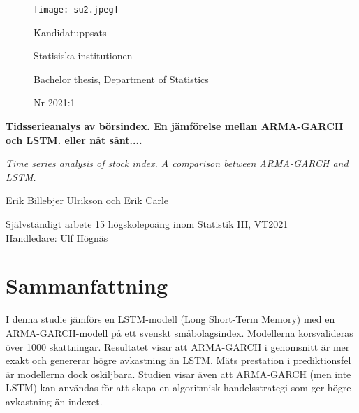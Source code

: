 \documentclass[11pt]{article}
\numberwithin{equation}{section}
\numberwithin{table}{section}
\numberwithin{figure}{section}
\begin{document}
\begin{titlepage}
\thispagestyle{empty}
	\begin{figure}[ht]
			\texttt{[image: su2.jpeg]}
			
	   \endminipage
		 \Large Kandidatuppsats \par
		 \large Statisiska institutionen \par
		  \small Bachelor thesis, Department of   Statistics \par
		   \large Nr 2021:1 \par
			
\endminipage
\end{figure}
	
	
\centering
\vspace{5cm}

{\large\bfseries Tidsserieanalys av börsindex. En jämförelse mellan ARMA-GARCH och LSTM. eller nåt sånt....\par}
	\vspace{0.5cm}
	
{\large\itshape Time series analysis of stock index. A comparison between ARMA-GARCH and LSTM. \par}
	\vfill
	
	

{\Large Erik Billebjer Ulrikson och Erik Carle\par}
	\vspace{0.5cm}
	
\begin{flushleft}
Självständigt arbete 15 högskolepoäng inom Statistik III, VT2021 \\
Handledare: Ulf Högnäs\\

\end{flushleft}
\end{titlepage}


\newpage
\thispagestyle{empty}
\section*{Sammanfattning}
I denna studie jämförs en LSTM-modell (Long Short-Term Memory) med en ARMA-GARCH-modell på ett svenskt småbolagsindex. Modellerna korsvalideras över 1000 skattningar. Resultatet visar att ARMA-GARCH i genomsnitt är mer exakt och genererar högre avkastning än LSTM. Mäts prestation i prediktionsfel är modellerna dock oskiljbara. Studien visar även att ARMA-GARCH (men inte LSTM) kan användas för att skapa en algoritmisk handelsstrategi som ger högre avkastning än indexet.
\end{document}
